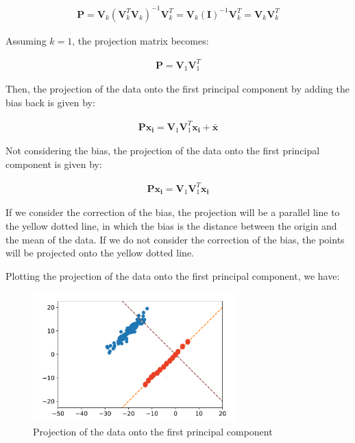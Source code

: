 \documentclass[12pt,a4paper,oneside]{paper}
\begin{document}
\begin{align*}
    \bm{P} = \bm{V}_k (\bm{V}_k^T \bm{V}_k)^{-1} \bm{V}_k^T = \bm{V}_k (\bm{I})^{-1} \bm{V}_k^T = \bm{V}_k \bm{V}_k^T
\end{align*}

Assuming $k = 1$, the projection matrix becomes:

\begin{align*}
    \bm{P} = \bm{V}_1 \bm{V}_1^T
\end{align*}

Then, the projection of the data onto the first principal component by adding the bias back is given by:

\begin{align*}
    \bm{P} \bm{x_i} = \bm{V}_1 \bm{V}_1^T \bm{x_i} + \bm{\bar{x}}
\end{align*}

Not considering the bias, the projection of the data onto the first principal component is given by:

\begin{align*}
    \bm{P} \bm{x_i} = \bm{V}_1 \bm{V}_1^T \bm{x_i}
\end{align*}

If we consider the correction of the bias, the projection will be a parallel line to the yellow dotted line, in which
the bias is the distance between the origin and the mean of the data. 
If we do not consider the correction of the bias, the points will be projected onto the yellow dotted line. 

Plotting the projection of the data onto the first principal component, we have:

\begin{figure}[H]
    \centering
    \includegraphics[width=0.7\textwidth]{proj.png}
    \caption{Projection of the data onto the first principal component}
    \label{fig:projection}
\end{figure}
\end{document}
